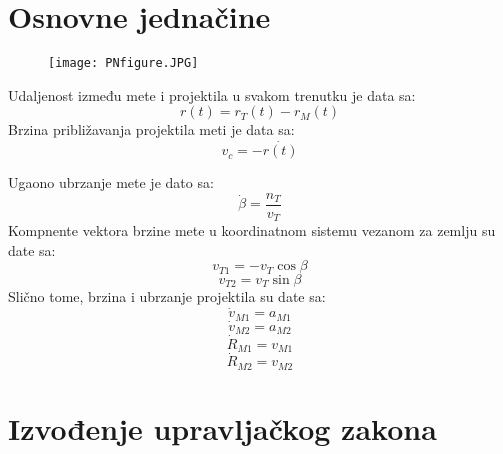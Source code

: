 
\section{Osnovne jednačine}

\begin{figure}[h!]
    \centering
    \texttt{[image: PNfigure.JPG]}
\end{figure}

Udaljenost između mete i projektila u svakom trenutku je data sa:
\begin{equation}
    r(t)=r_T(t)-r_M(t)
\end{equation}
Brzina približavanja projektila meti je data sa: 
\begin{equation}
    v_c=-\dot{r(t)}
\end{equation}

Ugaono ubrzanje mete je dato sa:
\begin{equation}
    \dot{\beta}=\frac{n_T}{v_T}
\end{equation}
Kompnente vektora brzine mete u koordinatnom sistemu vezanom za zemlju su date sa:
\begin{equation}
    v_{T1}=-v_T\cos{\beta}
\end{equation}
\begin{equation}
    v_{T2}=v_T\sin{\beta}
\end{equation}
Slično tome, brzina i ubrzanje projektila su date sa:
\begin{equation}
    \dot{v}_{M1}=a_{M1}
\end{equation}
\begin{equation}
    \dot{v}_{M2}=a_{M2}
\end{equation}
\begin{equation}
    \dot{R}_{M1}=v_{M1}
\end{equation}
\begin{equation}
    \dot{R}_{M2}=v_{M2}
\end{equation}

    \section{Izvođenje upravljačkog zakona}



